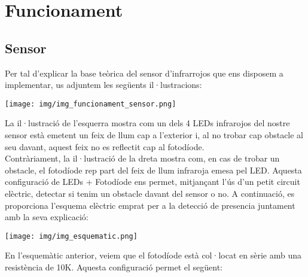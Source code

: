\documentclass[fleqn,10pt]{SelfArx} %
\affiliation{alloveras@salleurl.edu} %
\affiliation{Departament d'Enginyeria, La Salle Barcelona} %
\begin{document}
\flushbottom %

\maketitle %

\tableofcontents %

\thispagestyle{empty} %


\section{Funcionament}

\subsection{Sensor}
Per tal d’explicar la base teòrica del sensor d’infrarrojos
que ens disposem a implementar, us adjuntem les següents il·lustracions:\\

\begin{center}
\texttt{[image: img/img\_funcionament\_sensor.png]}
\end{center}


La il·lustració de l’esquerra mostra com un dels 4 LEDs infrarojos del nostre sensor està emetent un feix de llum cap a
l’exterior i, al no trobar cap obstacle al seu davant, aquest feix no es reflectit cap al fotodíode.\\

Contràriament, la il·lustració de la dreta mostra com, en cas
de trobar un obstacle, el fotodíode rep part del feix de llum
infraroja emesa pel LED.
Aquesta configuració de LEDs + Fotodíode ens permet, mitjançant
l’ús d’un petit circuit elèctric, detectar si tenim un obstacle
davant del sensor o no.
A continuació, es proporciona l’esquema elèctric emprat per
a la detecció de presencia juntament amb la seva explicació:
\begin{center}
\texttt{[image: img/img\_esquematic.png]}
\end{center}

En l’esquemàtic anterior, veiem que el fotodíode està col·locat
en sèrie amb una resistència de 10K. Aquesta configuració
permet el següent:
\end{document}
